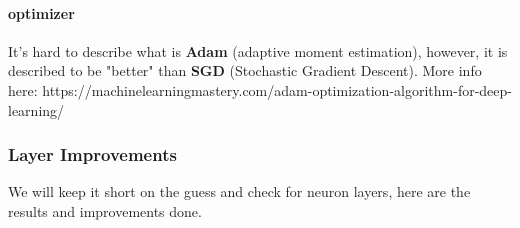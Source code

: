 \paragraph{optimizer} It's hard to describe what is \textbf{Adam} (adaptive moment estimation), however, it is described to be "better" than \textbf{SGD} (Stochastic Gradient Descent). More info here: https://machinelearningmastery.com/adam-optimization-algorithm-for-deep-learning/

\subsubsection{Layer Improvements}

We will keep it short on the guess and check for neuron layers, here are the results and improvements done.

